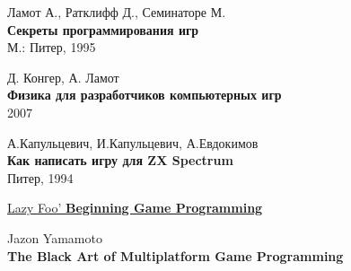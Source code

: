 \begin{thebibliography}{99}

Ламот А., Ратклифф Д., Семинаторе М.\\
\textbf{Секреты программирования игр}\\
М.: Питер, 1995

Д. Конгер, А. Ламот\\
\textbf{Физика для разработчиков компьютерных игр}\\
2007

А.Капульцевич, И.Капульцевич, А.Евдокимов\\
\textbf{Как написать игру для ZX Spectrum}\\
Питер, 1994

\href{https://lazyfoo.net/tutorials/SDL/index.php}{Lazy Foo' \textbf{Beginning Game Programming}}


Jazon Yamamoto\\
\textbf{The Black Art of Multiplatform Game Programming}

\end{thebibliography}

\secup
